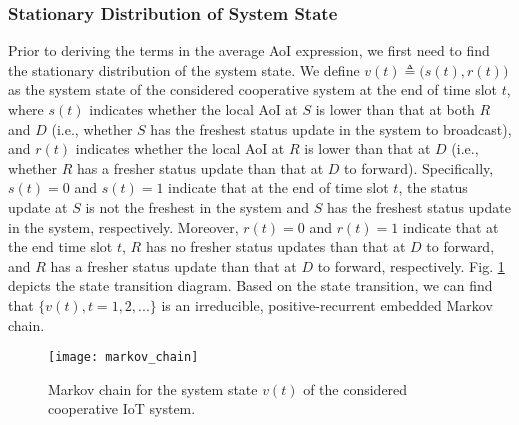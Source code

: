 \documentclass{IEEEtran}
\begin{document}
%
\subsubsection{Stationary Distribution of System State}
Prior to deriving the terms in the average AoI expression, we first need to find the stationary distribution of the system state.  We define $v(t) \triangleq \big(s(t), r(t)\big)$ as the system state of the considered cooperative system at the end of time slot $t$, where $s(t)$ indicates whether the local AoI at $S$ is lower than that at both $R$ and $D$ (i.e., whether $S$ has the freshest status update in the system to broadcast), and $r(t)$ indicates whether the local AoI at $R$ is lower than that at $D$ (i.e., whether $R$ has a fresher status update than that at $D$ to forward). Specifically, $s(t)=0$ and $s(t)=1$ indicate that at the end of time slot $t$, the status update at $S$ is not the freshest in the system and $S$ has the freshest status update in the system, respectively. Moreover, $r(t)=0$ and $r(t)=1$ indicate that at the end time slot $t$, $R$ has no fresher status updates than that at $D$ to forward, and $R$ has a fresher status update than that at $D$ to forward, respectively. Fig. \ref{Markov} depicts the state transition diagram. Based on the state transition, we can find that $\{v(t), t=1,2,...\}$ is an irreducible, positive-recurrent embedded Markov chain.


\begin{figure}
	\centering
	\texttt{[image: markov\_chain]}
	\caption{Markov chain for the system state $v(t)$ of the considered cooperative IoT system.}
	\label{Markov}
	\vspace{-0.4cm}
\end{figure}




%
%	
%	
\end{document}
